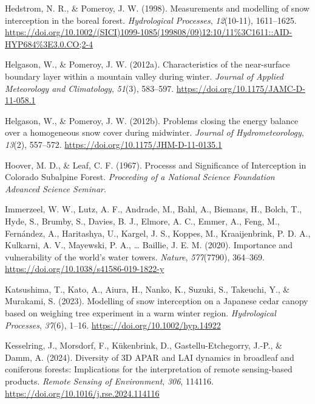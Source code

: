 \documentclass[
]{agujournal2019}
\newlength{\cslhangindent}
\newenvironment{CSLReferences}[2] %
 {\begin{list}{}{%
  \setlength{\itemindent}{0pt}
  \setlength{\leftmargin}{0pt}
  \setlength{\parsep}{0pt}
  \ifodd #1
   \setlength{\leftmargin}{\cslhangindent}
   \setlength{\itemindent}{-1\cslhangindent}
  \fi
  \setlength{\itemsep}{#2\baselineskip}}}
 {\end{list}}
\begin{document}
\begin{CSLReferences}{1}{0}
Hedstrom, N. R., \& Pomeroy, J. W. (1998). Measurements and modelling of
snow interception in the boreal forest. \emph{Hydrological Processes},
\emph{12}(10-11), 1611--1625.
\url{https://doi.org/10.1002/(SICI)1099-1085(199808/09)12:10/11\%3C1611::AID-HYP684\%3E3.0.CO;2-4}

Helgason, W., \& Pomeroy, J. W. (2012a). Characteristics of the
near-surface boundary layer within a mountain valley during winter.
\emph{Journal of Applied Meteorology and Climatology}, \emph{51}(3),
583--597. \url{https://doi.org/10.1175/JAMC-D-11-058.1}

Helgason, W., \& Pomeroy, J. W. (2012b). Problems closing the energy
balance over a homogeneous snow cover during midwinter. \emph{Journal of
Hydrometeorology}, \emph{13}(2), 557--572.
\url{https://doi.org/10.1175/JHM-D-11-0135.1}

Hoover, M. D., \& Leaf, C. F. (1967). Processs and {Significance} of
{Interception} in {Colorado Subalpine Forest}. \emph{Proceeding of a
{National Science Foundation Advanced Science Seminar}}.

Immerzeel, W. W., Lutz, A. F., Andrade, M., Bahl, A., Biemans, H.,
Bolch, T., Hyde, S., Brumby, S., Davies, B. J., Elmore, A. C., Emmer,
A., Feng, M., Fernández, A., Haritashya, U., Kargel, J. S., Koppes, M.,
Kraaijenbrink, P. D. A., Kulkarni, A. V., Mayewski, P. A., \ldots{}
Baillie, J. E. M. (2020). Importance and vulnerability of the world's
water towers. \emph{Nature}, \emph{577}(7790), 364--369.
\url{https://doi.org/10.1038/s41586-019-1822-y}

Katsushima, T., Kato, A., Aiura, H., Nanko, K., Suzuki, S., Takeuchi,
Y., \& Murakami, S. (2023). Modelling of snow interception on a
{Japanese} cedar canopy based on weighing tree experiment in a warm
winter region. \emph{Hydrological Processes}, \emph{37}(6), 1--16.
\url{https://doi.org/10.1002/hyp.14922}

Kesselring, J., Morsdorf, F., Kükenbrink, D., Gastellu-Etchegorry,
J.-P., \& Damm, A. (2024). Diversity of {3D APAR} and {LAI} dynamics in
broadleaf and coniferous forests: {Implications} for the interpretation
of remote sensing-based products. \emph{Remote Sensing of Environment},
\emph{306}, 114116. \url{https://doi.org/10.1016/j.rse.2024.114116}


\end{CSLReferences}
\end{document}
